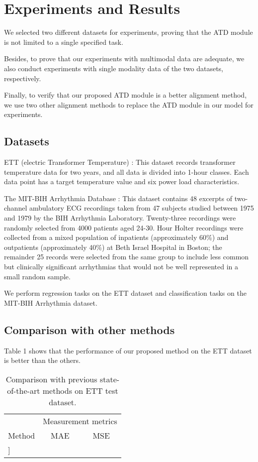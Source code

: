 \documentclass{ecai}
\begin{document}
\section{Experiments and Results}
We selected two different datasets for experiments, proving that the ATD module is not limited to a single specified task.

Besides, to prove that our experiments with multimodal data are adequate, we also conduct experiments with single modality data of the two datasets, respectively.

Finally, to verify that our proposed ATD module is a better alignment method, we use two other alignment methods to replace the ATD module in our model for experiments.

\subsection{Datasets}
 

ETT (electric Transformer Temperature) \cite{haoyietal-informer-2021}: This dataset records transformer temperature data for two years, and all data is divided into 1-hour classes. Each data point has a target temperature value and six power load characteristics.

The MIT-BIH Arrhythmia Database \cite{moody2001impact}: This dataset contains 48 excerpts of two-channel ambulatory ECG recordings taken from 47 subjects studied between 1975 and 1979 by the BIH Arrhythmia Laboratory. Twenty-three recordings were randomly selected from 4000 patients aged 24-30. Hour Holter recordings were collected from a mixed population of inpatients (approximately 60\%) and outpatients (approximately 40\%) at Beth Israel Hospital in Boston; the remainder 25 records were selected from the same group to include less common but clinically significant arrhythmias that would not be well represented in a small random sample.

We perform regression tasks on the ETT dataset and classification tasks on the MIT-BIH Arrhythmia dataset.

\subsection{Comparison with other methods}
Table 1 shows that the performance of our proposed method on the ETT dataset is better than the others.

\begin{table}
\begin{center}
{\caption{Comparison with previous state-of-the-art methods
on ETT test dataset.}\label{table1}}
\begin{tabular}{lcc}
\hline
\rule{0pt}{12pt}
&\multicolumn{2}{c}{Measurement metrics}\\
\cline{2-3}
\rule{0pt}{12pt}
Method &MAE &MSE
\\
\hline
\-6pt]

\end{tabular}
\end{center}
\end{table}
\end{document}
